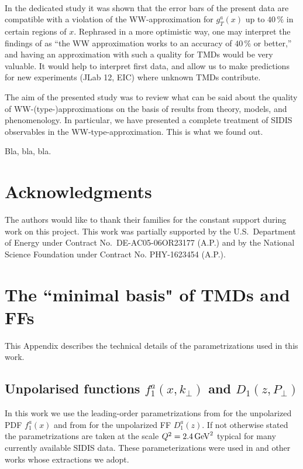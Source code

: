 \documentclass[a4paper,11pt]{article}
\begin{document}
\

In the dedicated study \cite{Accardi:2009au} it was shown that the
error bars of the present data are compatible with a violation of the 
WW-approximation for $g_T^a(x)$ up to $40\,\%$ in certain regions of $x$. 
Rephrased in a more optimistic way, one may interpret the findings of
\cite{Accardi:2009au} as ``the WW approximation works to an accuracy of
 $40\,\%$ or better,'' and having an approximation with such a quality
for TMDs would be very valuable. It would help to interpret first
data, and allow us to make predictions for new experiments 
(JLab 12, EIC) where unknown TMDs contribute.

The aim of the presented study was to review what can be said about
the quality of  WW-(type-)approximations on the basis of results
from theory, models, and phenomenology. In particular, we have
presented a complete treatment of SIDIS observables in the
WW-type-approximation. This is what we found out.

Bla, bla, bla.



\section{Acknowledgments}
The authors would like to thank their families for the constant support during work on this project. This work was partially supported by the U.S.\
Department of Energy under Contract No.~DE-AC05-06OR23177 (A.P.) and by the National Science Foundation under Contract No. PHY-1623454 (A.P.).


 
\newpage
\appendix

\section{\boldmath The ``minimal basis" of TMDs and FFs}
\label{App:basis}

This Appendix describes the technical details of the parametrizations
used in this work.

\subsection{\boldmath Unpolarised functions $f_1^a(x,k_\perp)$ 
			and $D_1(z,P_\perp)$}
\label{App:basis-f1-D1}

In this work we use the leading-order parametrizations 
from \cite{Martin:2009iq} for the unpolarized PDF $f_1^a(x)$ and 
from \cite{deFlorian:2007aj} for the unpolarized FF $D_1^a(z)$.
If not otherwise stated the parametrizations are taken at the scale 
$Q^2=2.4\,{\rm GeV}^2$ typical for many currently available SIDIS data.
These parameterizations were used in \cite{Anselmino:2005nn} and other 
works whose extractions we adopt. 
\end{document}
